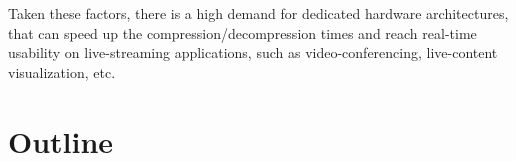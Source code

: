 Taken these factors, there is a high demand for dedicated hardware architectures, that can speed up the compression/decompression times and reach real-time usability on live-streaming applications, such as video-conferencing, live-content visualization, etc.




\section{Outline}


\clearpage
\printbibliography[heading=subbibliography]

